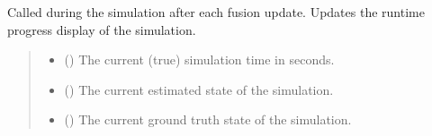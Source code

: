 \documentclass[letterpaper,10pt,english]{sphinxmanual}
\begin{document}
\begin{fulllineitems}
\begin{fulllineitems}
\label{\detokenize{modules/simulation/display:qnav.simulation.display.MultilineDisplay.on_update}}
\pysigstartsignatures
{}
\pysigstopsignatures
\sphinxAtStartPar
Called during the simulation after each fusion update.
Updates the runtime progress display of the simulation.
\begin{quote}\begin{description}
\begin{itemize}
\item {} 
\sphinxAtStartPar
{} () \textendash{} The current (true) simulation time in seconds.

\item {} 
\sphinxAtStartPar
{} ({\hyperref[\detokenize{modules/estimation/state:qnav.estimation.state.EstimatedState}]{}}) \textendash{} The current estimated state of the simulation.

\item {} 
\sphinxAtStartPar
{} ({\hyperref[\detokenize{modules/waypoints/trajectory:qnav.waypoints.trajectory.GroundTruth}]{}}) \textendash{} The current ground truth state of the simulation.

\end{itemize}

\end{description}\end{quote}

\end{fulllineitems}



\end{fulllineitems}
\end{document}
